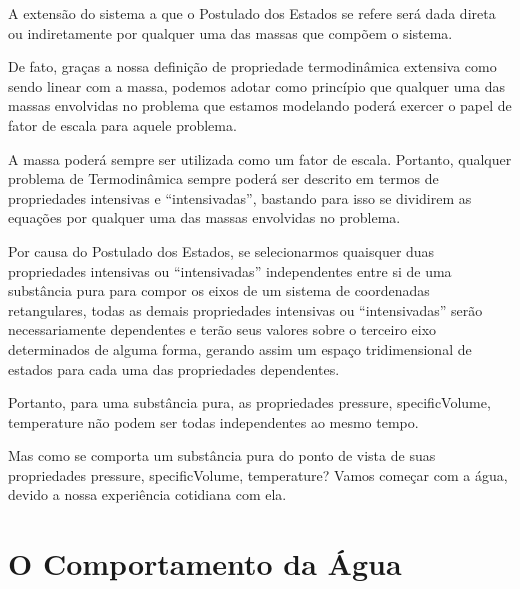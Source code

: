     A extensão do sistema a que o Postulado dos Estados se refere será dada
    direta ou indiretamente por qualquer uma das massas que compõem o sistema.

    De fato, graças a nossa definição de propriedade termodinâmica extensiva
    como sendo linear com a massa, podemos adotar como princípio que qualquer
    uma das massas envolvidas no problema que estamos modelando poderá exercer
    o papel de fator de escala para aquele problema.

    A massa poderá sempre ser utilizada como um fator de escala. Portanto,
    qualquer problema de Termodinâmica sempre poderá ser descrito em termos de
    propriedades intensivas e \enquote{intensivadas}, bastando para isso se
    dividirem as equações por qualquer uma das massas envolvidas no problema.

    Por causa do Postulado dos Estados, se selecionarmos quaisquer duas
    propriedades intensivas ou \enquote{intensivadas} independentes entre si de
    uma substância pura para compor os eixos de um sistema de coordenadas
    retangulares, todas as demais propriedades intensivas ou
    \enquote{intensivadas} serão necessariamente dependentes e terão seus
    valores sobre o terceiro eixo determinados de alguma forma, gerando assim
    um espaço tridimensional de estados para cada uma das propriedades
    dependentes.

    Portanto, para uma substância pura, as propriedades \gls{pressure},
    \gls{specificVolume}, \gls{temperature} não podem ser todas independentes
    ao mesmo tempo.

    Mas como se comporta um substância pura do ponto de vista de suas
    propriedades \gls{pressure}, \gls{specificVolume}, \gls{temperature}? Vamos
    começar com a água, devido a nossa experiência cotidiana com ela.


    \section{O Comportamento da Água}

